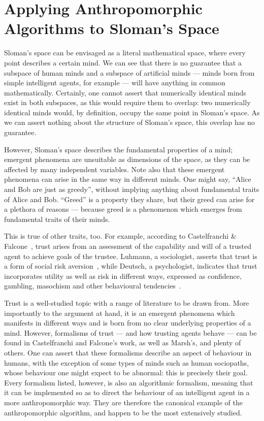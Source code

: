 \section{Applying Anthropomorphic Algorithms to Sloman's Space}

Sloman's space can be envisaged as a literal mathematical space, where every point describes a certain mind. We can see that there is no guarantee that a subspace of human minds and a subspace of artificial minds --- minds born from simple intelligent agents, for example --- will have anything in common mathematically. Certainly, one cannot assert that numerically identical minds exist in both subspaces, as this would require them to overlap: two numerically identical minds would, by definition, occupy the same point in Sloman's space. As we can assert nothing about the structure of Sloman's space, this overlap has no guarantee.\par

However, Sloman's space describes the fundamental properties of a mind; emergent phenomena are unsuitable as dimensions of the space, as they can be affected by many independent variables. Note also that these emergent phenomena can arise in the same way in different minds. One might say, ``Alice and Bob are just as greedy'', without implying anything about fundamental traits of Alice and Bob. ``Greed'' is a property they share, but their greed can arise for a plethora of reasons --- because greed is a phenomenon which emerges from fundamental traits of their minds.\par

This is true of other traits, too. For example, according to Castelfranchi \& Falcone~\citep{CastelfranchiSocialApproach}, trust arises from an assessment of the capability and will of a trusted agent to achieve goals of the trustee. Luhmann, a sociologist, asserts that trust is a form of social risk aversion~\citep{luhmann2000familiarity}, while Deutsch, a psychologist, indicates that trust incorporates utility as well as risk in different ways, expressed as confidence, gambling, masochism and other behavioural tendencies~\citep{deutsch1962cooperation}.\par

Trust is a well-studied topic with a range of literature to be drawn from. More importantly to the argument at hand, it is an emergent phenomena which manifests in different ways and is born from no clear underlying properties of a mind. However, formalisms of trust --- and how trusting agents behave --- can be found in Castelfranchi and Falcone's work, as well as Marsh's, and plenty of others. One can assert that these formalisms describe an aspect of behaviour in humans, with the exception of some types of minds such as human sociopaths, whose behaviour one might expect to be abnormal: this is precisely their goal. Every formalism listed, however, is also an algorithmic formalism, meaning that it can be implemented so as to direct the behaviour of an intelligent agent in a more anthropomorphic way. They are therefore the canonical example of the anthropomorphic algorithm, and happen to be the most extensively studied.\par

